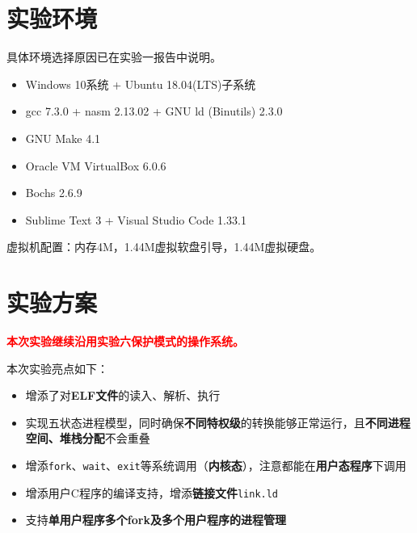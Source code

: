\documentclass[logo,reportComp]{thesis}
\begin{document}
\section{实验环境}
具体环境选择原因已在实验一报告中说明。
\begin{itemize}
	\item Windows 10系统 + Ubuntu 18.04(LTS)子系统
	\item gcc 7.3.0 + nasm 2.13.02 + GNU ld (Binutils) 2.3.0
	\item GNU Make 4.1
	\item Oracle VM VirtualBox 6.0.6
	\item Bochs 2.6.9
	\item Sublime Text 3 + Visual Studio Code 1.33.1
\end{itemize}

虚拟机配置：内存4M，1.44M虚拟软盘引导，1.44M虚拟硬盘。

\section{实验方案}
{\textbf{\textcolor{red}{本次实验继续沿用实验六保护模式的操作系统。}}}

本次实验亮点如下：
\begin{itemize}
	\item 增添了对\textbf{ELF文件}的读入、解析、执行
	\item 实现五状态进程模型，同时确保\textbf{不同特权级}的转换能够正常运行，且\textbf{不同进程空间、堆栈分配}不会重叠
	\item 增添\verb'fork'、\verb'wait'、\verb'exit'等系统调用（\textbf{内核态}），注意都能在\textbf{用户态程序}下调用
	\item 增添用户C程序的编译支持，增添\textbf{链接文件}\verb'link.ld'
	\item 支持\textbf{单用户程序多个fork及多个用户程序的进程管理}
\end{itemize}
\end{document}

